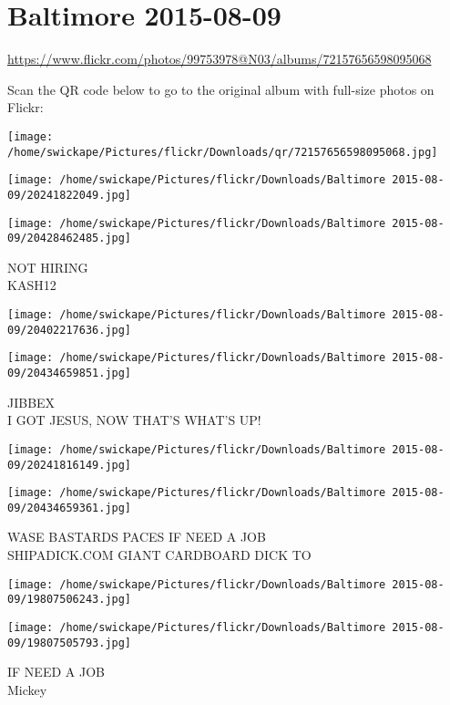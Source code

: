 \documentclass[10pt,letterpaper]{article}
\title{}
\author{}
\date{}
\begin{document}
\section*{Baltimore 2015-08-09}

\url{https://www.flickr.com/photos/99753978@N03/albums/72157656598095068}

Scan the QR code below to go to the original album with full-size photos on Flickr:

\texttt{[image: /home/swickape/Pictures/flickr/Downloads/qr/72157656598095068.jpg]}
\pagebreak

\texttt{[image: /home/swickape/Pictures/flickr/Downloads/Baltimore 2015-08-09/20241822049.jpg]}

\vspace{0.25in}
\texttt{[image: /home/swickape/Pictures/flickr/Downloads/Baltimore 2015-08-09/20428462485.jpg]}

NOT HIRING\\
KASH12
\pagebreak

\texttt{[image: /home/swickape/Pictures/flickr/Downloads/Baltimore 2015-08-09/20402217636.jpg]}

\vspace{0.25in}
\texttt{[image: /home/swickape/Pictures/flickr/Downloads/Baltimore 2015-08-09/20434659851.jpg]}

JIBBEX\\
I GOT JESUS, NOW THAT'S WHAT'S UP!
\pagebreak

\texttt{[image: /home/swickape/Pictures/flickr/Downloads/Baltimore 2015-08-09/20241816149.jpg]}

\vspace{0.25in}
\texttt{[image: /home/swickape/Pictures/flickr/Downloads/Baltimore 2015-08-09/20434659361.jpg]}

WASE BASTARDS PACES IF NEED A JOB\\
SHIPADICK.COM GIANT CARDBOARD DICK TO
\pagebreak

\texttt{[image: /home/swickape/Pictures/flickr/Downloads/Baltimore 2015-08-09/19807506243.jpg]}

\vspace{0.25in}
\texttt{[image: /home/swickape/Pictures/flickr/Downloads/Baltimore 2015-08-09/19807505793.jpg]}

IF NEED A JOB\\
Mickey
\pagebreak
\end{document}
